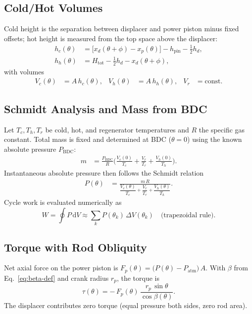 \documentclass[12pt]{article}
\begin{document}
\subsection{Cold/Hot Volumes}
Cold height is the separation between displacer and power piston minus fixed offsets; hot height is measured from the top space above the displacer:
\begin{align}
  h_{c}(\theta) &= \bigl[x_{d}(\theta+\phi) - x_{p}(\theta)\bigr] - h_{\mathrm{pin}} - \tfrac{1}{2}h_{d},\\
  h_{h}(\theta) &= H_{\mathrm{tot}} - \tfrac{1}{2}h_{d} - x_{d}(\theta+\phi),
\end{align}
with volumes
\begin{align}
  V_{c}(\theta) &= A\,h_{c}(\theta), & V_{h}(\theta) &= A\,h_{h}(\theta), & V_{r} &= \text{const}.
\end{align}

\subsection{Schmidt Analysis and Mass from BDC}
Let \(T_{c},T_{h},T_{r}\) be cold, hot, and regenerator temperatures and \(R\) the specific gas constant. Total mass is fixed and determined at BDC (\(\theta=0\)) using the known absolute pressure \(P_{\mathrm{BDC}}\):
\begin{align}
  m &= \frac{P_{\mathrm{BDC}}}{R}\biggl( \frac{V_{c}(0)}{T_{c}} + \frac{V_{r}}{T_{r}} + \frac{V_{h}(0)}{T_{h}} \biggr).
\end{align}
Instantaneous absolute pressure then follows the Schmidt relation
\begin{align}
  P(\theta) &= \frac{m\,R}{\dfrac{V_{c}(\theta)}{T_{c}} + \dfrac{V_{r}}{T_{r}} + \dfrac{V_{h}(\theta)}{T_{h}} }.
\end{align}
Cycle work is evaluated numerically as
\begin{equation}
  W = \oint P\,\mathrm{d}V \approx \sum_{k} P(\theta_{k})\,\Delta V(\theta_{k}) \quad \text{(trapezoidal rule)}.
\end{equation}

\subsection{Torque with Rod Obliquity}
Net axial force on the power piston is \(F_{p}(\theta) = \bigl(P(\theta)-P_{\mathrm{atm}}\bigr)\,A\). With \(\beta\) from Eq.~\eqref{eq:beta-def} and crank radius \(r_{p}\), the torque is
\begin{equation}
  \tau(\theta) = -\,F_{p}(\theta)\,\frac{r_{p}\,\sin\theta}{\cos\beta(\theta)}.
\end{equation}
The displacer contributes zero torque (equal pressure both sides, zero rod area).
\end{document}
